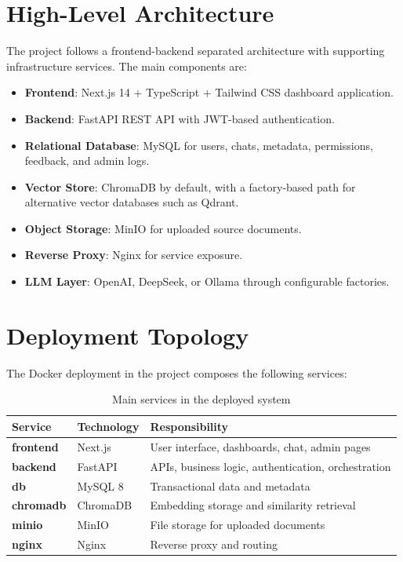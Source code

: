 \documentclass[12pt,a4paper]{report}
\begin{document}
\section{High-Level Architecture}

The project follows a frontend-backend separated architecture with supporting infrastructure services. The main components are:
\begin{itemize}[leftmargin=1.5em]
\item \textbf{Frontend}: Next.js 14 + TypeScript + Tailwind CSS dashboard application.
\item \textbf{Backend}: FastAPI REST API with JWT-based authentication.
\item \textbf{Relational Database}: MySQL for users, chats, metadata, permissions, feedback, and admin logs.
\item \textbf{Vector Store}: ChromaDB by default, with a factory-based path for alternative vector databases such as Qdrant.
\item \textbf{Object Storage}: MinIO for uploaded source documents.
\item \textbf{Reverse Proxy}: Nginx for service exposure.
\item \textbf{LLM Layer}: OpenAI, DeepSeek, or Ollama through configurable factories.
\end{itemize}

\section{Deployment Topology}

The Docker deployment in the project composes the following services:
\begin{table}[H]
\centering
\begin{tabularx}{\textwidth}{>{\bfseries}l l X}
\toprule
Service & Technology & Responsibility \\
\midrule
frontend & Next.js & User interface, dashboards, chat, admin pages \\
backend & FastAPI & APIs, business logic, authentication, orchestration \\
db & MySQL 8 & Transactional data and metadata \\
chromadb & ChromaDB & Embedding storage and similarity retrieval \\
minio & MinIO & File storage for uploaded documents \\
nginx & Nginx & Reverse proxy and routing \\
\bottomrule
\end{tabularx}
\caption{Main services in the deployed system}
\end{table}
\end{document}
